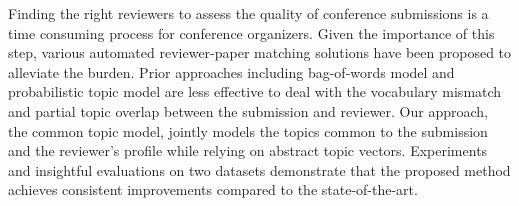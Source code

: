 Finding the right reviewers to assess the quality of conference submissions is a time consuming process for conference organizers. Given the importance of this step, various automated reviewer-paper matching solutions have been proposed to alleviate the burden. Prior approaches including bag-of-words model and probabilistic topic model are less  effective to deal with the vocabulary mismatch and partial topic overlap between the submission and reviewer. Our approach, the common topic model,  jointly models the topics common to the submission and the reviewer's  profile while relying on abstract topic vectors. Experiments and insightful evaluations on two datasets demonstrate that the proposed method  achieves consistent improvements  compared to the state-of-the-art.